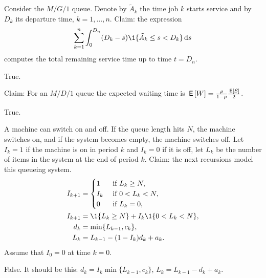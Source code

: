 \documentclass[stochastic-or.tex]{subfiles}
\begin{document}
\begin{truefalse}
Consider the $M/G/1$ queue.
Denote by $\tilde{A}_k$ the time job $k$ starts service and by $D_k$ its departure time, $k=1,\ldots,n$.
Claim: the expression
\begin{equation*}
\sum_{k=1}^{n} \int_0^{D_n} (D_k-s)\1{\As_k \leq s < D_k} \d s
\end{equation*}
computes the total remaining service time up to time $t = D_n$.
\begin{solution}
True.
\end{solution}
\end{truefalse}


\begin{truefalse}
Claim: For an $M/D/1$ queue the expected waiting time is $\,\mathsf{E}\left[W\right]=\frac{\rho}{1-\rho}\frac{\,\mathsf{E}\left[S\right]}{2}$.
\begin{solution}
        True.
\end{solution}
\end{truefalse}

\begin{truefalse}[5.6]
A machine can switch on and off.
If the queue length hits $N$, the machine switches on, and if the system becomes empty, the machine switches off.
Let $I_k=1$ if the machine is on in period $k$ and $I_k=0$ if it is off, let $L_k$ be the number of items in the system at the end of period $k$.
Claim: the next recursions model this queueing system.
 \begin{align*}
 I_{k+1} &=
 \begin{cases}
 1 & \text{ if } L_{k} \geq N,\\
 I_k & \text{ if } 0< L_{k} <N,\\
 0 & \text{ if } L_{k} =0,\\
 \end{cases}\\
 I_{k+1} &= \1{L_k\geq N} + I_k \1{0<L_k<N}, \\
d_k &=\min\{L_{k-1}, c_k\}, \\
L_k &= L_{k-1} - (1-I_k) d_k + a_k.
 \end{align*}
 Assume that $I_0 =0$ at time $k=0$.
\begin{solution}
 False.
It should be this: $d_k =I_k \min\{L_{k-1}, c_k\}$, $L_k = L_{k-1} - d_k + a_k$.
\end{solution}
\end{truefalse}
\end{document}
